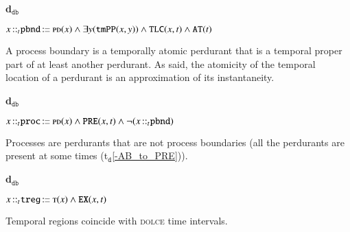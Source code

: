 \documentclass[ao]{iosart2x}
\newcommand{\dolceAxLabel}{\textrm{a$_\texttt{d}$}}
\newcommand{\dolceThrLabel}{\textrm{t$_\texttt{d}$}}
\newcommand{\dbDefLabel}{\textrm{d$_\texttt{db}$}}
\newcounter{cntdbdf}
\newcommand{\dbdf}[1]{\refstepcounter{cntdbdf}\begin{small}{\bf \dbDefLabel\thecntdbdf\label{#1}}\end{small}}
\newcommand{\refdolceax}[1]{({\dolceAxLabel}\ref{#1})}
\newcommand{\refdolceth}[1]{({\dolceThrLabel}\ref{#1})}
\newcommand{\pr}[1]{\mathtt{#1}}
\newcommand{\cn}[1]{\mathtt{#1}}
\newcommand\textequal{%
 \rule[.08ex]{5pt}{0.35pt}\llap{\rule[.78ex]{5pt}{0.35pt}}}
\newcommand{\sdef}{{\hspace{1.5pt}:\hspace{-2.5pt}\textequal\hspace{3pt}}}
\newcommand{\dolce}{{\textsc{dolce}}}
\newcommand {\ABdcat} {\textsc{ab}}
\newcommand {\PDdcat} {\textsc{pd}}
\newcommand {\Tdcat} {\textsc{t}}
\newcommand {\PPd} {\ensuremath{\pr{PP}}}
\newcommand {\ATd} {\ensuremath{\pr{AT}}}
\newcommand {\PREd} {\ensuremath{\pr{PRE}}}
\newcommand {\TLCd} {\ensuremath{\pr{TLC}}}
\newcommand{\procbcat}{\cn{proc}}
\newcommand{\pbndbcat}{\cn{pbnd}}
\newcommand{\tregbcat}{\cn{treg}}
\newcommand{\bfotppart}{\pr{tmPP}}
\newcommand{\bfoexist}{\pr{EX}}
\newcommand{\bfoiof}[1]{{\,::_{#1\:\!}}}
\newcommand{\bfotregof}{\pr{TREG}}
\begin{document}
%
 
\item[\dbdf{d2b_pbnd}] $x \bfoiof{t} \pbndbcat \sdef \PDdcat(x) \land \exists y(\bfotppart(x,y)) \land \TLCd(x,t) \land \ATd(t)$

\vspace{1pt}
A process boundary is a temporally atomic perdurant that is a temporal proper part of at least another perdurant. As said, the atomicity of the temporal location of a perdurant is an approximation of its instantaneity. 

%
%
%

\item[\dbdf{d2b_proc}] $x \bfoiof{t} \procbcat \sdef \PDdcat(x) \land \PREd(x,t) \land \neg(x \bfoiof{t} \pbndbcat)$

\vspace{1pt}
Processes are perdurants that are not process boundaries (all the perdurants are present at some times \refdolceth{-AB_to_PRE}).

%

\item[\dbdf{d2b_treg}] $x \bfoiof{t} \tregbcat \sdef \Tdcat(x) \land \bfoexist(x,t)$

\vspace{1pt}
Temporal regions coincide with {\dolce} time intervals.
\end{document}
